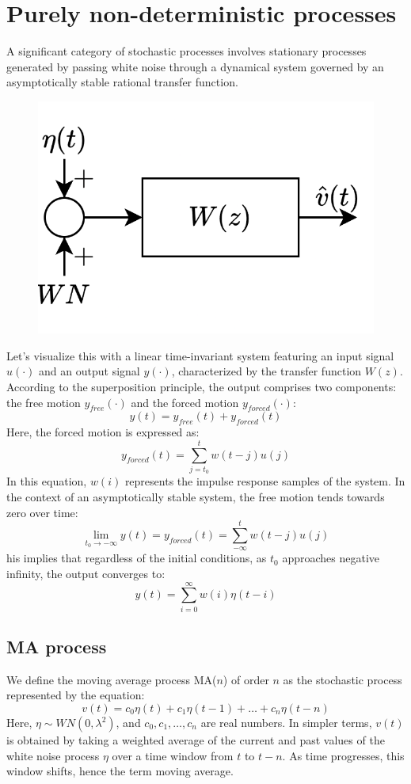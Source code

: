 \section{Purely non-deterministic processes}

A significant category of stochastic processes involves stationary processes generated by passing white noise through a dynamical system governed by an asymptotically stable rational transfer function.
\begin{figure}[H]
    \centering
    \includegraphics[width=0.3\linewidth]{images/ndet.png} 
\end{figure}
Let's visualize this with a linear time-invariant system featuring an input signal $u(\cdot)$ and an output signal $y(\cdot)$, characterized by the transfer function $W(z)$. 
According to the superposition principle, the output comprises two components: the free motion $y_{free}(\cdot)$ and the forced motion $y_{forced}(\cdot)$: 
\[y(t)=y_{free}(t)+y_{forced}(t)\]
Here, the forced motion is expressed as:
\[y_{forced}(t)=\sum_{j=t_0}^{t}w(t-j)u(j)\]
In this equation, $w(i)$ represents the impulse response samples of the system.
In the context of an asymptotically stable system, the free motion tends towards zero over time:
\[\lim_{t_0 \rightarrow -\infty}y(t)=y_{forced}(t)=\sum_{-\infty}^t w(t-j)u(j)\]
his implies that regardless of the initial conditions, as $t_0$ approaches negative infinity, the output converges to:
\[y(t)=\sum_{i=0}^{\infty}w(i)\eta(t-i)\]

\subsection{MA process}
We define the moving average process MA($n$) of order $n$ as the stochastic process represented by the equation:
\[v(t) = c_0\eta(t) + c_1\eta(t-1) + \dots + c_n\eta(t-n)\]
Here, $\eta \sim WN(0, \lambda^2)$, and  $c_0, c_1,\dots, c_n$ are real numbers.
In simpler terms, $v(t)$ is obtained by taking a weighted average of the current and past values of the white noise process $\eta$ over a time window from $t$ to $t-n$.
As time progresses, this window shifts, hence the term moving average.

